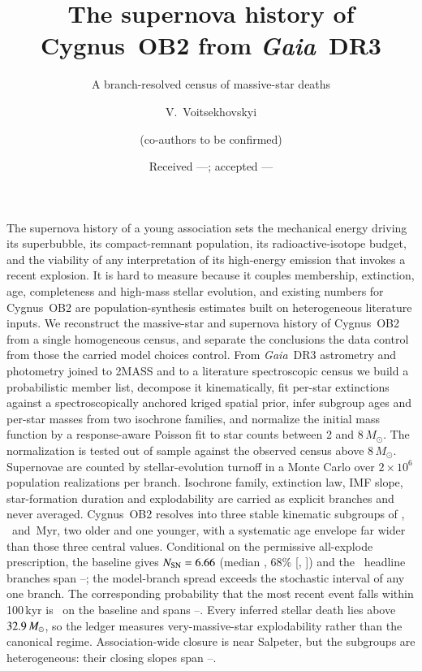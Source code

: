 \documentclass{aa}
\begin{document}
\title{The supernova history of Cygnus~OB2 from \textit{Gaia}~DR3}
\subtitle{A branch-resolved census of massive-star deaths}

\author{
  V.~Voitsekhovskyi
  \and
  (co-authors to be confirmed)
}

\date{Received ---; accepted ---}

\abstract
{The supernova history of a young association sets the mechanical energy
driving its superbubble, its compact-remnant population, its radioactive-isotope
budget, and the viability of any interpretation of its high-energy emission
that invokes a recent explosion. It is hard to measure because it couples
membership, extinction, age, completeness and high-mass stellar evolution, and
existing numbers for Cygnus~OB2 are population-synthesis estimates built on
heterogeneous literature inputs.}
{We reconstruct the massive-star and supernova history of Cygnus~OB2 from a
single homogeneous census, and separate the conclusions the data control from
those the carried model choices control.}
{From \textit{Gaia}~DR3 astrometry and photometry joined to 2MASS and to a
literature spectroscopic census we build a probabilistic member list, decompose
it kinematically, fit per-star extinctions against a spectroscopically anchored
kriged spatial prior, infer subgroup ages and per-star masses from two isochrone
families, and normalize the initial mass function by a response-aware Poisson
fit to star counts between 2 and 8\,$M_\odot$. The normalization is tested out
of sample against the observed census above 8\,$M_\odot$. Supernovae are counted
by stellar-evolution turnoff in a Monte Carlo over $2\times10^{6}$ population
realizations per branch. Isochrone family, extinction law, IMF slope,
star-formation duration and explodability are carried as explicit branches and
never averaged.}
{Cygnus~OB2 resolves into three stable kinematic subgroups of \ageA, \ageB\ and
\ageC\,Myr, two older and one younger, with a systematic age envelope far wider
than those three central values. Conditional on the permissive all-explode
prescription, the baseline gives $N_{\rm SN} = 6.66$ (median \NSNmedian, 68\%
[\NSNlo, \NSNhi]) and the \NSNheadbranches\ headline branches span
\NSNheadlo--\NSNheadhi; the model-branch spread exceeds the stochastic interval
of any one branch. The corresponding probability that the most recent event
falls within 100\,kyr is \Precent\ on the baseline and spans
\Precentheadlo--\Precentheadhi. Every inferred stellar death lies above
$32.9\,M_\odot$, so the ledger measures very-massive-star
explodability rather than the canonical regime. Association-wide closure is near
Salpeter, but the subgroups are heterogeneous: their closing slopes span
\closingAlphaC--\closingAlphaA.}
\end{document}
